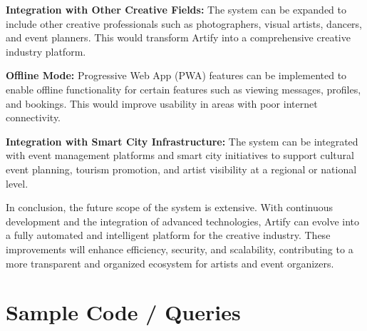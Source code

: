 \documentclass[12pt,a4paper]{report}
\begin{document}
\textbf{Integration with Other Creative Fields:}
The system can be expanded to include other creative professionals such as photographers, visual artists, dancers, and event planners. This would transform Artify into a comprehensive creative industry platform.

\vspace{0.3cm}

\textbf{Offline Mode:}
Progressive Web App (PWA) features can be implemented to enable offline functionality for certain features such as viewing messages, profiles, and bookings. This would improve usability in areas with poor internet connectivity.

\vspace{0.3cm}

\textbf{Integration with Smart City Infrastructure:}
The system can be integrated with event management platforms and smart city initiatives to support cultural event planning, tourism promotion, and artist visibility at a regional or national level.

\vspace{0.5cm}

In conclusion, the future scope of the system is extensive. With continuous development and the integration of advanced technologies, Artify can evolve into a fully automated and intelligent platform for the creative industry. These improvements will enhance efficiency, security, and scalability, contributing to a more transparent and organized ecosystem for artists and event organizers.


\clearpage

\setcounter{chapter}{8}
\setcounter{section}{0}
\clearpage
\thispagestyle{empty}

\noindent
{}

\clearpage
{}

\pagestyle{maincontent}

\section{Sample Code / Queries}
\end{document}
